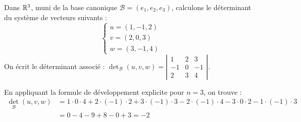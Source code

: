 \documentclass[12pt, a4paper]{report}
\begin{document}
\begin{remark}
\begin{itemize}


    \end{itemize}
\end{remark}

\begin{example}[Dans $\R^3$]
    Dans $\R^3$, muni de la base canonique $\mathcal{B} = (e_1, e_2, e_3)$, calculons le déterminant du système de vecteurs suivants :
    $$\begin{cases}
        u = (1,-1,2)\\
        v = (2,0,3) \\
        w = (3,-1,4)
    \end{cases}$$
    On écrit le déterminant associé : $\det_{\mathcal{B}}(u,v,w) = \left|\begin{matrix} 1 & 2 & 3 \\ -1 & 0 & -1 \\ 2 & 3 & 4 \end{matrix}\right|$.
    
    En appliquant la formule de développement explicite pour $n=3$, on trouve :
    \begin{align*}
        \det_{\mathcal{B}}(u,v,w) &= 1 \cdot 0 \cdot 4 + 2 \cdot (-1) \cdot 2 + 3 \cdot (-1) \cdot 3 - 2 \cdot (-1) \cdot 4 - 3 \cdot 0 \cdot 2 - 1 \cdot (-1) \cdot 3 \\
        &= 0 - 4 - 9 + 8 - 0 + 3 = -2
    \end{align*} 
\end{example}
\end{document}
